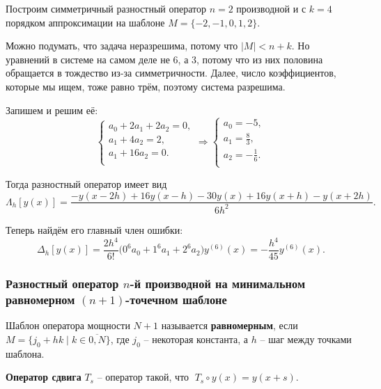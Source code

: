 \documentclass[../main.tex]{subfile}
\begin{document}
\begin{example}\label{eq:central_do_example}
	Построим симметричный разностный оператор $n=2$ производной и с $k=4$
	порядком аппроксимации на шаблоне $M=\{-2,-1,0,1,2\}$.

	Можно подумать, что задача неразрешима, потому что $|M|<n+k$. Но
	уравнений в системе на самом деле не 6, а 3, потому что из них половина
	обращается в тождество из-за симметричности. Далее, число коэффициентов,
	которые мы ищем, тоже равно трём, поэтому система разрешима.

	Запишем и решим её:
	\begin{equation*}
		\begin{cases}
			a_0 + 2a_1 + 2a_2 = 0, \\
			a_1 + 4a_2 = 2, \\
			a_1 + 16a_2 = 0. \\
		\end{cases}
		\Rightarrow
		\begin{cases}
			a_0 = -5, \\
			a_1 = \frac{8}{3}, \\
			a_2 = -\frac{1}{6}.\\
		\end{cases}
	\end{equation*}

	Тогда разностный оператор имеет вид
	\[\Lambda_h[y(x)]=\frac{-y(x-2h)+16y(x-h)-30y(x)+16y(x+h)-y(x+2h)}
	{6h^2}.\]

	Теперь найдём его главный член ошибки:
	\[\Delta_h[y(x)]=\frac{2h^4}{6!}\big(0^6a_0+1^6a_1+2^6a_2\big)y^{(6)}
	(x)=-\frac{h^4}{45}y^{(6)}(x).\]
\end{example}
\newpage

\subsubsection{Разностный оператор $n$-й производной на минимальном равномерном
$(n+1)$-точечном шаблоне}

\begin{define}
	Шаблон оператора мощности $N+1$ называется \textbf{равномерным}, если \\
	$M=\{j_0+hk\mid k\in\overline{0,N}\}$, где $j_0$ -- некоторая константа,
	а $h$ -- шаг между точками шаблона.
\end{define}

\begin{define}
	\textbf{Оператор сдвига} $T_s$ -- оператор такой, что
	$\; T_s\circ y(x)=y(x+s)$.
\end{define}
\end{document}
